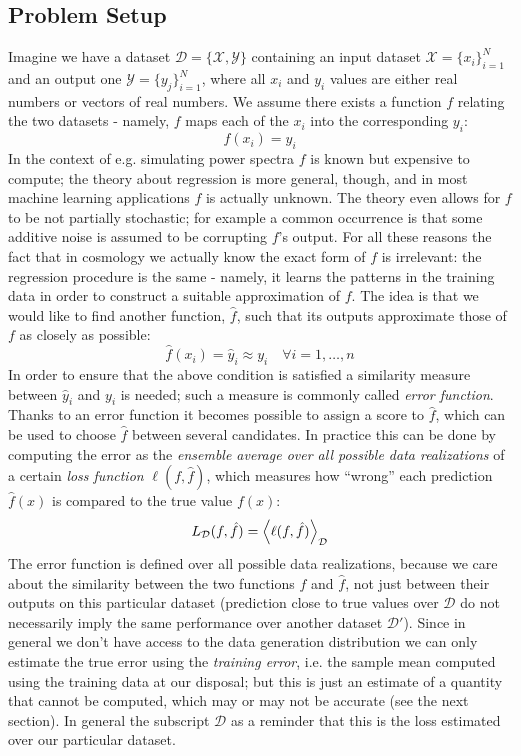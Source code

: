 \subsection{Problem Setup}
Imagine we have a dataset $\mathcal{D} = \{\mathcal{X}, \mathcal{Y}\}$ containing an input dataset $\mathcal{X} = \{x_i\}_{i=1}^N$ and an output one $\mathcal{Y} = \{y_j\}_{i=1}^N$, where all $x_i$ and $y_i$ values are either real numbers or vectors of real numbers. We assume there exists a function $f$ relating the two datasets - namely, $f$ maps each of the $x_i$ into the corresponding $y_i$:
\begin{equation*}
    f(x_i) = y_i
\end{equation*}
In the context of e.g. simulating power spectra $f$ is known but expensive to compute; the theory about regression is more general, though, and in most machine learning applications $f$ is actually unknown. The theory even allows for $f$ to be not partially stochastic; for example a common occurrence is that some additive noise is assumed to be corrupting $f$'s output. For all these reasons the fact that in cosmology we actually know the exact form of $f$ is irrelevant: the regression procedure is the same - namely, it learns the patterns in the training data in order to construct a suitable approximation of $f$. The idea is that we would like to find another function, $\hat{f}$, such that its outputs approximate those of $f$ as closely as possible:
\begin{equation*}
    \hat{f}(x_i) = \hat{y}_i \approx y_i \quad \forall i = 1, \dots, n
\end{equation*}
In order to ensure that the above condition is satisfied a similarity measure between $\hat{y}_i$ and $y_i$ is needed; such a measure is commonly called \emph{error function}. Thanks to an error function it becomes possible to assign a score to $\hat{f}$, which can be used to choose $\hat{f}$ between several candidates. In practice this can be done by computing the error as the \emph{ensemble average over all possible data realizations} of a certain \emph{loss function} $\ell(f, \hat{f})$, which measures how ``wrong'' each prediction $\hat{f}(x)$ is compared to the true value $f(x)$:
\begin{equation*}
    L_\mathcal{D}(f, \hat{f}) = \expval{\ell(f, \hat{f})}_\mathcal{D}
\end{equation*}
The error function is defined over all possible data realizations, because we care about the similarity between the two functions $f$ and $\hat{f}$, not just between their outputs on this particular dataset (prediction close to true values over $\mathcal{D}$ do not necessarily imply the same performance over another dataset $\mathcal{D}'$). Since in general we don't have access to the data generation distribution we can only estimate the true error using the \emph{training error}, i.e. the sample mean computed using the training data at our disposal; but this is just an estimate of a quantity that cannot be computed, which may or may not be accurate (see the next section). In general the subscript $\mathcal{D}$ as a reminder that this is the loss estimated over our particular dataset.

